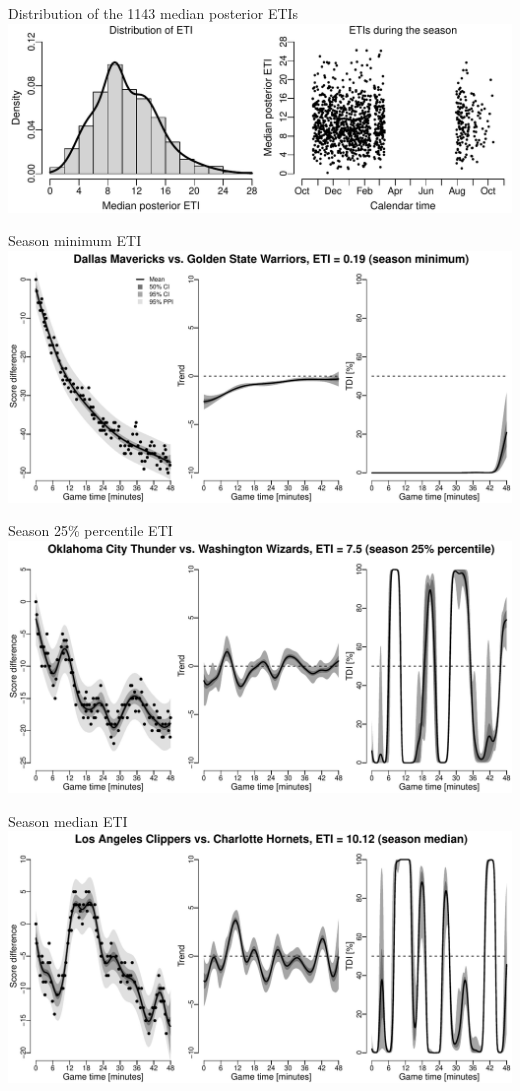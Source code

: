 \documentclass[ignorenonframetext,xcolor=pdflatex,table,dvipsnames,serif]{beamer}
\begin{document}
\begin{frame}{Distribution of the 1143 median posterior ETIs}
\includegraphics[scale=0.5]{fig3.pdf}
\end{frame}

\begin{frame}{Season minimum ETI}
\includegraphics[scale=0.5]{fig4_1.pdf}
\end{frame}

\begin{frame}{Season 25\% percentile ETI}
\includegraphics[scale=0.5]{fig4_2.pdf}
\end{frame}

\begin{frame}{Season median ETI}
\includegraphics[scale=0.5]{fig4_3.pdf}
\end{frame}
\end{document}
